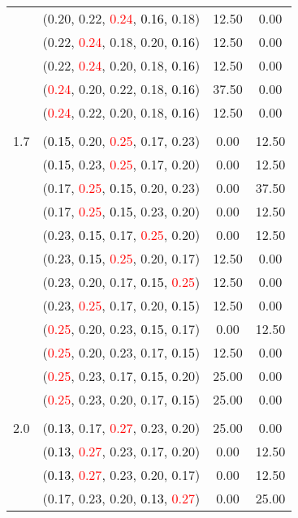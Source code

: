 \documentclass[10pt,a4paper]{report}
\begin{document}
\begin{center}
\begin{longtable}{clcc}
			&(0.20, 0.22, \textcolor{red}{0.24}, \textcolor{black}{0.16}, 0.18)&12.50&0.00\\
			&(0.22, \textcolor{red}{0.24}, 0.18, 0.20, \textcolor{black}{0.16})&12.50&0.00\\
			&(0.22, \textcolor{red}{0.24}, 0.20, 0.18, \textcolor{black}{0.16})&12.50&0.00\\
			&(\textcolor{red}{0.24}, 0.20, 0.22, 0.18, \textcolor{black}{0.16})&37.50&0.00\\
			&(\textcolor{red}{0.24}, 0.22, 0.20, 0.18, \textcolor{black}{0.16})&12.50&0.00\\
		&&&\\
		1.7			&(\textcolor{black}{0.15}, 0.20, \textcolor{red}{0.25}, 0.17, 0.23)&0.00&12.50\\
			&(\textcolor{black}{0.15}, 0.23, \textcolor{red}{0.25}, 0.17, 0.20)&0.00&12.50\\
			&(0.17, \textcolor{red}{0.25}, \textcolor{black}{0.15}, 0.20, 0.23)&0.00&37.50\\
			&(0.17, \textcolor{red}{0.25}, \textcolor{black}{0.15}, 0.23, 0.20)&0.00&12.50\\
			&(0.23, \textcolor{black}{0.15}, 0.17, \textcolor{red}{0.25}, 0.20)&0.00&12.50\\
			&(0.23, \textcolor{black}{0.15}, \textcolor{red}{0.25}, 0.20, 0.17)&12.50&0.00\\
			&(0.23, 0.20, 0.17, \textcolor{black}{0.15}, \textcolor{red}{0.25})&12.50&0.00\\
			&(0.23, \textcolor{red}{0.25}, 0.17, 0.20, \textcolor{black}{0.15})&12.50&0.00\\
			&(\textcolor{red}{0.25}, 0.20, 0.23, \textcolor{black}{0.15}, 0.17)&0.00&12.50\\
			&(\textcolor{red}{0.25}, 0.20, 0.23, 0.17, \textcolor{black}{0.15})&12.50&0.00\\
			&(\textcolor{red}{0.25}, 0.23, 0.17, \textcolor{black}{0.15}, 0.20)&25.00&0.00\\
			&(\textcolor{red}{0.25}, 0.23, 0.20, 0.17, \textcolor{black}{0.15})&25.00&0.00\\
		&&&\\
		2.0			&(\textcolor{black}{0.13}, 0.17, \textcolor{red}{0.27}, 0.23, 0.20)&25.00&0.00\\
			&(\textcolor{black}{0.13}, \textcolor{red}{0.27}, 0.23, 0.17, 0.20)&0.00&12.50\\
			&(\textcolor{black}{0.13}, \textcolor{red}{0.27}, 0.23, 0.20, 0.17)&0.00&12.50\\
			&(0.17, 0.23, 0.20, \textcolor{black}{0.13}, \textcolor{red}{0.27})&0.00&25.00\\

\end{longtable}
\end{center}
\end{document}
